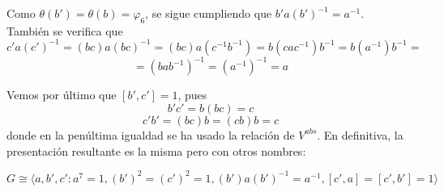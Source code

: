 \documentclass[12pt]{article}
\begin{document}
\begin{ejercicio}
\begin{enumerate}[label=(\alph*)]
\begin{itemize}
\begin{itemize}
\begin{itemize}
                        Como $\theta(b') = \theta(b) = \varphi_6$, se sigue cumpliendo que $b'a(b')^{-1} = a^{-1}$. \\ 

                        También se verifica que $$c'a(c')^{-1} = (bc)a(bc)^{-1} = (bc)a(c^{-1}b^{-1}) = b(cac^{-1})b^{-1} = b(a^{-1})b^{-1} = $$ $$ = (bab^{-1})^{-1} = (a^{-1})^{-1} = a$$

                        Vemos por último que $[b',c'] = 1$, pues $$b'c' = b(bc) = c$$ $$c'b' = (bc)b = (cb)b = c$$ donde en la penúltima igualdad se ha usado la relación de $V^{abs}$. En definitiva, la presentación resultante es la misma pero con otros nombres:
                        
                        $$G \cong \langle a,b',c' : a^7=1, (b')^2 = (c')^2=1, (b')a(b')^{-1} = a^{-1}, [c',a] = [c',b'] = 1 \rangle$$
                    \end{itemize}
                \end{itemize}
            \end{itemize}
        \end{enumerate}
    \end{ejercicio}
\end{document}
